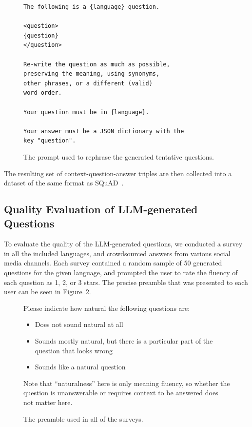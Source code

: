 \documentclass[10pt, a4paper]{article}
\begin{document}
\begin{figure}
\scriptsize
\begin{verbatim}
The following is a {language} question.

<question>
{question}
</question>

Re-write the question as much as possible,
preserving the meaning, using synonyms,
other phrases, or a different (valid)
word order.

Your question must be in {language}.

Your answer must be a JSON dictionary with the
key "question".
\end{verbatim}
\caption{The prompt used to rephrase the generated tentative questions.}
\label{fig:rephrasing-prompt}
\end{figure}

The resulting set of context-question-answer triples are then collected into a dataset of the same format as SQuAD~.


\subsection{Quality Evaluation of LLM-generated Questions}
\label{sec:quality-evaluation}

To evaluate the quality of the LLM-generated questions, we conducted a survey in all the included languages, and crowdsourced answers from various social media channels. Each survey contained a random sample of 50 generated questions for the given language, and prompted the user to rate the fluency of each question as 1, 2, or 3 stars. The precise preamble that was presented to each user can be seen in Figure~\ref{fig:survey-preamble}.

\begin{figure}[!htb]
    \begin{itshape}
        \small
        Please indicate how natural the following questions are:

        \begin{itemize}
            \item[$\star$] Does not sound natural at all
            \item[$\star\star$] Sounds mostly natural, but there is a particular part of the question that looks wrong
            \item[$\star\star\star$] Sounds like a natural question
        \end{itemize}

        Note that ``naturalness'' here is only meaning fluency, so whether the question is unanswerable or requires context to be answered does not matter here.
    \end{itshape}
    \caption{The preamble used in all of the surveys.}
    \label{fig:survey-preamble}
\end{figure}
\end{document}
